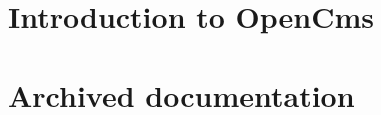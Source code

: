 \documentclass[a4paper,titlepage,12pt]{scrbook}
\begin{document}


\frontmatter
\tableofcontents
\mainmatter

\part{Introduction to OpenCms}







\part{Archived documentation}













\printindex  
\end{document}
